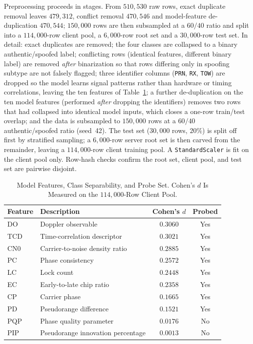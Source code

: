 \documentclass[journal]{IEEEtran}
\begin{document}
Preprocessing proceeds in stages. From $510{,}530$ raw rows, exact duplicate removal leaves $479{,}312$, conflict removal $470{,}546$ and model-feature de-duplication $470{,}544$; $150{,}000$ rows are then subsampled at a $60/40$ ratio and split into a $114{,}000$-row client pool, a $6{,}000$-row root set and a $30{,}000$-row test set. In detail: exact duplicates are removed; the four classes are collapsed to a binary authentic/spoofed label; conflicting rows (identical features, different binary label) are removed \emph{after} binarization so that rows differing only in spoofing subtype are not falsely flagged; three identifier columns (\texttt{PRN}, \texttt{RX}, \texttt{TOW}) are dropped so the model learns signal patterns rather than hardware or timing correlations, leaving the ten features of Table~\ref{tab:features}; a further de-duplication on the ten model features (performed \emph{after} dropping the identifiers) removes two rows that had collapsed into identical model inputs, which closes a one-row train/test overlap; and the data is subsampled to $150{,}000$ rows at a $60/40$ authentic/spoofed ratio (seed~42). The test set ($30{,}000$ rows, $20\%$) is split off first by stratified sampling; a $6{,}000$-row server root set is then carved from the remainder, leaving a $114{,}000$-row client training pool. A \texttt{StandardScaler} is fit on the client pool only. Row-hash checks confirm the root set, client pool, and test set are pairwise disjoint.

\begin{table}[!t]
\renewcommand{\arraystretch}{1.25}
\caption{Model Features, Class Separability, and Probe Set. Cohen's $d$ Is Measured on the $114{,}000$-Row Client Pool.}
\label{tab:features}
\centering
\footnotesize
\setlength{\tabcolsep}{4pt}
\begin{tabular}{llcc}
\toprule
\textbf{Feature} & \textbf{Description} & \textbf{Cohen's $d$} & \textbf{Probed} \\
\midrule
DO  & Doppler observable                  & $0.3060$ & Yes \\
TCD & Time-correlation descriptor         & $0.3021$ & Yes \\
CN0 & Carrier-to-noise density ratio      & $0.2885$ & Yes \\
PC  & Phase consistency                   & $0.2572$ & Yes \\
LC  & Lock count                          & $0.2448$ & Yes \\
EC  & Early-to-late chip ratio            & $0.2358$ & Yes \\
CP  & Carrier phase                       & $0.1665$ & Yes \\
PD  & Pseudorange difference              & $0.1521$ & Yes \\
\midrule
PQP & Phase quality parameter             & $0.0176$ & No \\
PIP & Pseudorange innovation percentage   & $0.0013$ & No \\
\bottomrule
\end{tabular}
\end{table}
\end{document}
